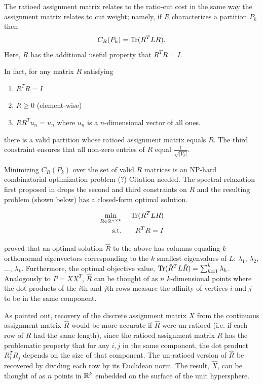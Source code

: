 The ratioed assignment matrix relates to the ratio-cut cost in the same
way the assignment matrix relates to cut weight; namely, if $R$
characterizes a partition $P_k$ then
\[ C_R(P_k) = \operatorname{Tr}(R^T L R). \]
Here, $R$ has the additional useful property that $R^T R = I$.

In fact, for any matrix $R$ satisfying
\begin{enumerate}
\item
$R^T R = I$

\item
$R \geq 0$ (element-wise)

\item
$R R^T u_n = u_n$ where $u_n$ is a $n$-dimensional vector of all ones.
\end{enumerate}
there is a valid partition whose ratioed assignment matrix equals $R$.
The third constraint ensures that all non-zero entries of $R$ equal
$\frac{1}{\sqrt{|V_h|}}$.

Minimizing $C_R(P_k)$ over the set of valid $R$ matrices is an NP-hard
combinatorial optimization problem (?) {\color{red}Citation needed}. The spectral relaxation first
proposed in \cite{Chan:94} drops the second and third constraints on
$R$ and the resulting problem (shown below) has a closed-form optimal
solution.

\begin{equation} \label{spectral_k-partition}
\begin{aligned}
\min_{R \in \mathbb{R}^{n \times k}} &\;& \operatorname{Tr}(R^T L R) \\
\text{s.t.}                  &\;& R^T R = I    \\
\end{aligned}
\end{equation}

\cite{Fan:50} proved that an optimal solution $\hat{R}$ to the above
has columns equaling $k$ orthonormal eigenvectors corresponding to
the $k$ smallest eigenvalues of $L$:
$\lambda_1$, $\lambda_2$, ..., $\lambda_k$.
Furthermore, the optimal objective value,
$\operatorname{Tr}(\hat{R}^T L \hat{R}) = \sum_{h=1}^k \lambda_h$.
Analogously to $P = X X^T$, $\hat{R}$ can be thought of as $n$
$k$-dimensional points where the dot products of the $i$th and $j$th
rows measure the affinity of vertices $i$ and $j$ to be in the same
component.

As \cite{Chan:94} pointed out, recovery of the discrete assignment matrix
$X$ from the continuous assignment matrix $\hat{R}$ would be more
accurate if $\hat{R}$ were un-ratioed (i.e. if each row of $R$ had the
same length), since the ratioed assignment matrix $R$ has the
problematic property that for any $i,j$ in the same component, the dot
product $R_i^T R_j$ depends on the size of that component.
The un-ratioed version of $\hat{R}$ be recovered by dividing each row
by its Euclidean norm. The result, $\hat{X}$, can be thought of as $n$
points in $\mathbb{R}^k$ embedded on the surface of the unit hypersphere.

